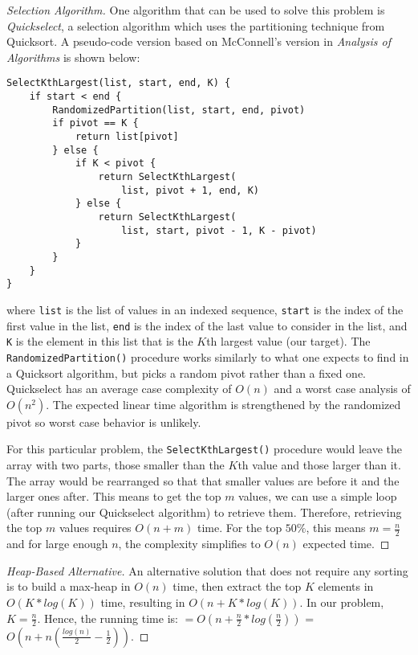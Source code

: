 \documentclass{scrartcl}
\begin{document}
\begin{flushleft}
\begin{proof}[Selection Algorithm]
        One algorithm that can be used to solve this problem is \textit{Quickselect}, a selection
        algorithm which uses the partitioning technique from Quicksort. A pseudo-code version based
        on McConnell's version in \textit{Analysis of Algorithms} is shown below:
        \medskip
\begin{verbatim}
SelectKthLargest(list, start, end, K) {
    if start < end {
        RandomizedPartition(list, start, end, pivot)
        if pivot == K {
            return list[pivot]
        } else {
            if K < pivot {
                return SelectKthLargest(
                    list, pivot + 1, end, K)
            } else {
                return SelectKthLargest(
                    list, start, pivot - 1, K - pivot)
            }
        }
    }
}
\end{verbatim}
        where \verb|list| is the list of values in an indexed sequence, \verb|start| is the index of
        the first value in the list, \verb|end| is the index of the last value to consider in the
        list, and \verb|K| is the element in this list that is the $K$th largest value (our target).
        The \verb|RandomizedPartition()| procedure works similarly to what one expects to find in a
        Quicksort algorithm, but picks a random pivot rather than a fixed one. Quickselect has an
        average case complexity of $O(n)$ and a worst case analysis of $O(n^2)$. The expected linear
        time algorithm is strengthened by the randomized pivot so worst case behavior is unlikely.
        \bigskip

        For this particular problem, the \verb|SelectKthLargest()| procedure would leave the array
        with two parts, those smaller than the $K$th value and those larger than it. The array would
        be rearranged so that that smaller values are before it and the larger ones after. This
        means to get the top $m$ values, we can use a simple loop (after running our Quickselect
        algorithm) to retrieve them. Therefore, retrieving the top $m$ values requires $O(n + m)$
        time. For the top $50\%$, this means $m = \frac{n}{2}$ and for large enough $n$, the
        complexity simplifies to $O(n)$ expected time.
    \end{proof}
    \begin{proof}[Heap-Based Alternative]\let\qed\relax
        An alternative solution that does not require any sorting is to build a max-heap in $O(n)$
        time, then extract the top $K$ elements in $O(K * log(K))$ time, resulting in $O(n + K *
        log(K))$. In our problem, $K = \frac{n}{2}$. Hence, the running time is: $ = O(n +
        \frac{n}{2} * log(\frac{n}{2}))$ = $O(n + n (\frac{log(n)}{2} - \frac{1}{2}))$.
    \end{proof}


\end{flushleft}
\end{document}
